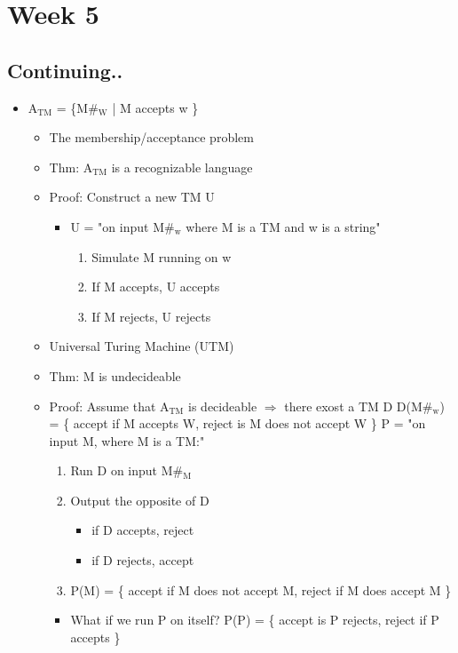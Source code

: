 \documentclass[11pt]{article}
\begin{document}
\section{Week 5}
\label{sec:org11aee03}
\subsection{Continuing..}
\label{sec:orge1e7951}
\begin{itemize}
\item A\(_{\text{TM}}\) = \{M\#\(_{\text{W}}\) | M accepts w \}
\begin{itemize}
\item The membership/acceptance problem
\item Thm: A\(_{\text{TM}}\) is a recognizable language
\item Proof: Construct a new TM U
\begin{itemize}
\item U = "on input M\#\(_{\text{w}}\) where M is a TM and w is a string"
\begin{enumerate}
\item Simulate M running on w
\item If M accepts, U accepts
\item If M rejects, U rejects
\end{enumerate}
\end{itemize}
\item Universal Turing Machine (UTM)
\item Thm: M is undecideable
\item Proof: Assume that A\(_{\text{TM}}\) is decideable
\(\Rightarrow\) there exost a TM D
D(M\#\(_{\text{w}}\)) = \{ accept if M accepts W, reject is M does not accept W \} 
P = "on input M, where M is a TM:"
\begin{enumerate}
\item Run D on input M\#\(_{\text{M}}\)
\item Output the opposite of D
\begin{itemize}
\item if D accepts, reject
\item if D rejects, accept
\end{itemize}
\item P(M) = \{ accept if M does not accept M, reject if M does accept M \}
\end{enumerate}
\begin{itemize}
\item What if we run P on itself?
P(P) = \{ accept is P rejects, reject if P accepts \}

\end{itemize}
\end{itemize}
\end{itemize}
\end{document}
